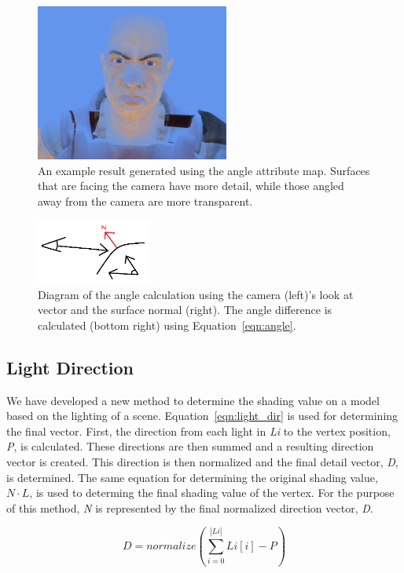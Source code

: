 \documentclass[annual]{acmsiggraph}
\begin{document}
\begin{figure}[h]
	\centering
	\includegraphics[width=2.5in]{images/angle_result}
	\caption{An example result generated using the angle attribute map. Surfaces that are facing the camera have more detail, while those angled away from the camera are more transparent.}
	\label{fig:angleResult}
\end{figure}

\begin{figure}[h]
	\centering
	\includegraphics[width=1.5in]{images/angle}
	\caption{Diagram of the angle calculation using the camera (left)'s look at vector and the surface normal (right). The angle difference is calculated (bottom right) using Equation~\ref{eqn:angle}.}
	\label{fig:angle}
\end{figure}

\subsection{Light Direction}
\label{sec:light_dir}
We have developed a new method to determine the shading value on a model based on the lighting of a scene. Equation~\ref{eqn:light_dir} is used for determining the final vector. First, the direction from each light in {\it{Li}} to the vertex position, {\it{P}}, is calculated. These directions are then summed and a resulting direction vector is created. This direction is then normalized and the final detail vector, {\it{D}}, is determined. The same equation for determining the original shading value, $N\cdot L$, is used to determing the final shading value of the vertex. For the purpose of this method, {\it{N}} is represented by the final normalized direction vector, {\it{D}}. 

\begin{equation}
\label{eqn:light_dir}
D = normalize({\sum_{i=0}^{|Li|} Li[i] - P})
\end{equation}
\end{document}
